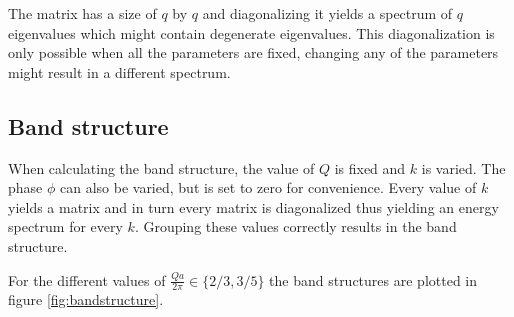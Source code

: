 \documentclass[letterpaper, 10 pt, conference]{ieeeconf}  %
\begin{document}
The matrix has a size of $q$ by $q$ and diagonalizing it yields a spectrum of $q$ eigenvalues which might contain degenerate eigenvalues.
This diagonalization is only possible when all the parameters are fixed, changing any of the parameters might result in a different spectrum.

\subsection{Band structure}
When calculating the band structure, the value of $Q$ is fixed and $k$ is varied. 
The phase $\phi$ can also be varied, but is set to zero for convenience.
Every value of $k$ yields a matrix and in turn every matrix is diagonalized thus yielding an energy spectrum for every $k$.
Grouping these values correctly results in the band structure.

For the different values of 
$\frac{Q a}{2 \pi} \in \{2/3,3/5 \}$ the band structures are plotted in figure \ref{fig:bandstructure}.
\end{document}
